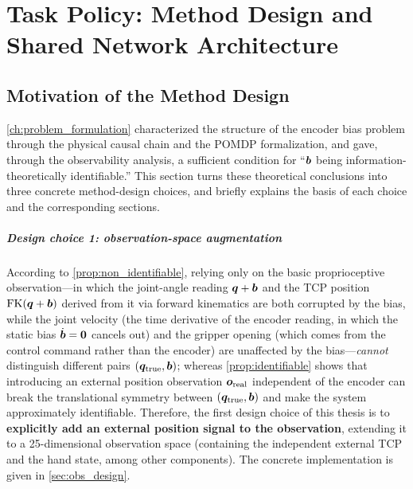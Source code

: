 
\chapter{Task Policy: Method Design and Shared Network Architecture}\label{ch:task_policy}

\section{Motivation of the Method Design}\label{sec:task_method_motivation}

\cref{ch:problem_formulation} characterized the structure of the encoder bias problem through the physical causal chain and the POMDP formalization, and gave, through the observability analysis, a sufficient condition for ``$\bm{b}$ being information-theoretically identifiable.'' This section turns these theoretical conclusions into three concrete method-design choices, and briefly explains the basis of each choice and the corresponding sections.

\paragraph{Design choice 1: observation-space augmentation} According to \cref{prop:non_identifiable}, relying only on the basic proprioceptive observation---in which the joint-angle reading $\bm{q}+\bm{b}$ and the TCP position $\text{FK}(\bm{q}+\bm{b})$ derived from it via forward kinematics are both corrupted by the bias, while the joint velocity (the time derivative of the encoder reading, in which the static bias $\dot{\bm{b}}=\bm{0}$ cancels out) and the gripper opening (which comes from the control command rather than the encoder) are unaffected by the bias---\emph{cannot} distinguish different pairs $(\bm{q}_{\text{true}}, \bm{b})$; whereas \cref{prop:identifiable} shows that introducing an external position observation $\bm{o}_{\text{real}}$ independent of the encoder can break the translational symmetry between $(\bm{q}_{\text{true}}, \bm{b})$ and make the system approximately identifiable. Therefore, the first design choice of this thesis is to \textbf{explicitly add an external position signal to the observation}, extending it to a 25-dimensional observation space (containing the independent external TCP and the hand state, among other components). The concrete implementation is given in \cref{sec:obs_design}.

